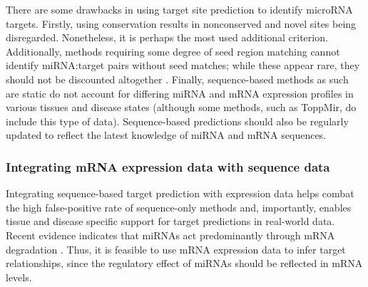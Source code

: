 There are some drawbacks in using target site prediction to identify microRNA
targets. Firstly, using conservation results in nonconserved and novel sites
being disregarded. Nonetheless, it is perhaps the most used additional
criterion. Additionally, methods requiring some degree of seed region matching
cannot identify miRNA:target pairs without seed matches; while these appear
rare, they should not be discounted altogether \citep{Bartel2009}. Finally,
sequence-based methods as such are static do not account for differing miRNA
and mRNA expression profiles in various tissues and disease states (although
some methods, such as ToppMir, do include this type of data). Sequence-based
predictions should also be regularly updated to reflect the latest knowledge
of miRNA and mRNA sequences.












\subsubsection{Integrating mRNA expression data with sequence data}

Integrating sequence-based target prediction with expression data helps combat the
high false-positive rate of sequence-only methods and, importantly, enables tissue and
disease specific support for target predictions in real-world data. Recent
evidence indicates that miRNAs act predominantly through mRNA degradation
\citep{Guo2010}. Thus, it is feasible to use mRNA expression data to
infer target relationships, since the regulatory effect of miRNAs should be
reflected in mRNA levels.

